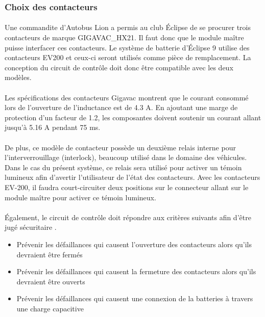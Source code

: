 	\subsubsection*{Choix des contacteurs}
		\paragraph*{}
		Une commandite d'Autobus Lion a permis au club Éclipse de se procurer trois contacteurs de marque GIGAVAC\_HX21. Il faut donc que le module maître puisse interfacer ces contacteurs. Le système de batterie d'Éclipse 9 utilise des contacteurs EV200 et ceux-ci seront utilisés comme pièce de remplacement. La conception du circuit de contrôle doit donc être compatible avec les deux modèles.

		\paragraph*{}
		Les spécifications des contacteurs Gigavac montrent que le courant consommé lors de l'ouverture de l'inductance est de 4.3 A. En ajoutant une marge de protection d'un facteur de 1.2, les composantes doivent soutenir un courant allant jusqu'à 5.16 A pendant 75 ms\cite{GigavacHX21}.

		\paragraph*{}
		De plus, ce modèle de contacteur possède un deuxième relais interne pour l'interverrouillage (interlock), beaucoup utilisé dans le domaine des véhicules. Dans le cas du présent système, ce relais sera utilisé pour activer un témoin lumineux afin d'avertir l'utilisateur de l'état des contacteurs. Avec les contacteurs EV-200, il faudra court-circuiter deux positions sur le connecteur allant sur le module maître pour activer ce témoin lumineux.

		\paragraph*{}
		Également, le circuit de contrôle doit répondre aux critères suivants afin d'être jugé sécuritaire \cite{System_Approach}.

		\begin{itemize}
			\item Prévenir les défaillances qui causent l'ouverture des contacteurs alors qu'ils devraient être fermés
			\item Prévenir les défaillances qui causent la fermeture des contacteurs alors qu'ils devraient être ouverts
			\item Prévenir les défaillances qui causent une connexion de la batteries à travers une charge capacitive
		\end{itemize}


